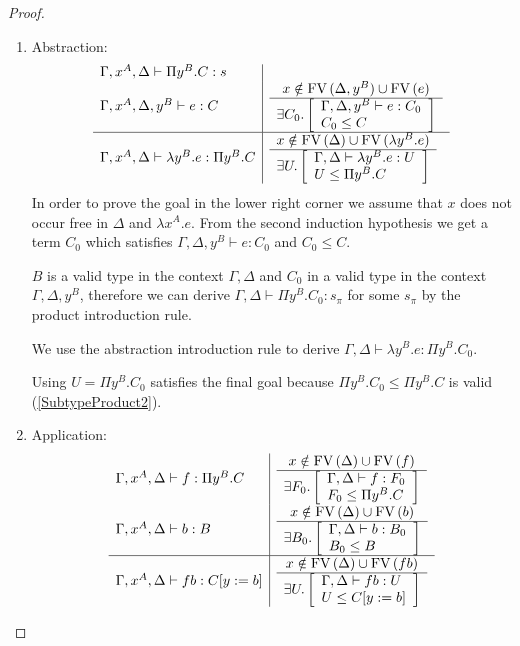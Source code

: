 \begin{lemma}
\begin{proof}
{\begin{enumerate}
\begin{enumerate}
                \item Abstraction:
                $$
                \begin{array}{l|l}
                    \Gamma,x^A,\Delta \vdash \Pi y^B.C : s
                    \\
                    \Gamma,x^A,\Delta,y^B \vdash e: C
                    &
                    \begin{array}{c}  x \notin \text{FV}\, (\Delta,y^B) \cup \text{FV}\, (e)  \\ \hline  \exists C_0. \left[ \begin{array}{l} \Gamma,\Delta,y^B \vdash e : C_0 \\ C_0 \le C \end{array} \right] \end{array}
                    \\
                    \hline
                    \Gamma,x^A,\Delta \vdash \lambda y^B. e: \Pi y^B.C
                    &
                    \begin{array}{c}  x \notin \text{FV}\, (\Delta) \cup \text{FV}\, (\lambda y^B. e)  \\ \hline  \exists U. \left[ \begin{array}{l} \Gamma,\Delta \vdash \lambda y^B. e : U \\ U \le \Pi y^B.C \end{array} \right] \end{array}
                \end{array}
                $$
                In order to prove the goal in the lower right corner we assume
                that $x$ does not occur free in $\Delta$ and $\lambda x^A.e$.
                From the second induction hypothesis we get a term $C_0$ which
                satisfies $\Gamma,\Delta,y^B \vdash e: C_0$ and $C_0 \le C$.

                $B$ is a valid type in the context $\Gamma,\Delta$ and $C_0$ in
                a valid type in the context
                $\Gamma,\Delta,y^B$, therefore we can derive $\Gamma,\Delta \vdash
                \Pi y^B.C_0 : s_\pi$ for some $s_\pi$ by the product
                introduction rule.

                We use the abstraction introduction rule to derive
                $\Gamma,\Delta \vdash \lambda y^B. e: \Pi y^B. C_0$.

                Using $U =
                \Pi y^B. C_0$ satisfies the final goal because $\Pi y^B. C_0 \le
                \Pi y^B. C$ is valid (\ref{SubtypeProduct2}).

                \item Application:
                $$
                \begin{array}{l|l}
                    \Gamma,x^A,\Delta \vdash f: \Pi y^B.C
                    &
                    \begin{array}{c}  x \notin \text{FV}\, (\Delta) \cup \text{FV}\, (f)  \\ \hline  \exists F_0. \left[ \begin{array}{l} \Gamma,\Delta \vdash f : F_0 \\ F_0 \le \Pi y^B.C \end{array} \right] \end{array}
                    \\
                    \Gamma,x^A,\Delta  \vdash b : B
                    &
                    \begin{array}{c}  x \notin \text{FV}\, (\Delta) \cup \text{FV}\, (b)  \\ \hline  \exists B_0. \left[ \begin{array}{l} \Gamma,\Delta \vdash b : B_0 \\ B_0 \le B \end{array} \right] \end{array}
                    \\
                    \hline
                    \Gamma,x^A,\Delta \vdash f b : C[y:=b]
                    &
                    \begin{array}{c}  x \notin \text{FV}\, (\Delta) \cup \text{FV}\, (f b)  \\ \hline  \exists U. \left[ \begin{array}{l} \Gamma,\Delta \vdash f b : U \\ U \le C[y:=b] \end{array} \right] \end{array}
                \end{array}
                $$


\end{enumerate}
\end{enumerate}}
\end{proof}
\end{lemma}
